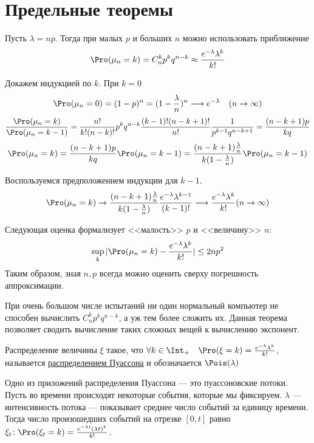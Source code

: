 \section{Предельные теоремы}

\begin{Th} [Пуассон]
Пусть $\lambda = np$. Тогда при малых $p$ и больших $n$ можно использовать приближение
$$\Pro(\mu_n = k) = C_n^kp^kq^{n-k} \approx \frac{e^{-\lambda}\lambda^k}{k!}$$
\end{Th}
\begin{Proof}
Докажем индукцией по $k$. При $k = 0$
$$\Pro(\mu_n = 0) = (1-p)^n = (1 - \frac{\lambda}{n})^n \longrightarrow e^{-\lambda} \quad (n \to \infty)$$
$$\frac{\Pro(\mu_n = k)}{\Pro(\mu_n = k-1)} = \frac{n!}{k!(n-k)!}p^kq^{n-k} \frac{(k-1)!(n-k+1)!}{n!} \frac{1}{p^{k-1}q^{n-k+1}} = \frac{(n-k+1)p}{kq}$$
$$\Pro(\mu_n = k) = \frac{(n-k+1)p}{kq}\Pro(\mu_n = k-1) = \frac{(n-k+1)\frac{\lambda}n}{k(1-\frac{\lambda}n)}\Pro(\mu_n = k-1)$$

Воспользуемся предположением индукции для $k-1$.
$$\Pro(\mu_n = k) \to \frac{(n-k+1)\frac{\lambda}n}{k(1-\frac{\lambda}n)} \frac{e^{-\lambda}\lambda^{k-1}}{(k-1)!} \longrightarrow \frac{e^{-\lambda}\lambda^{k}}{k!} (n \to \infty)$$
\end{Proof}

Следующая оценка формализует <<малость>> $p$ и <<величину>> $n$:
$$\sup\limits_k |\Pro(\mu_n = k) - \frac{e^{-\lambda}\lambda^k}{k!}| \le 2np^2$$
Таким образом, зная $n, p$ всегда можно оценить сверху погрешность аппроксимации.\\
\begin{Why}
При очень большом числе испытаний ни один нормальный компьютер не способен вычислить  $ C_n^kp^kq^{n-k}$, а уж тем более сложить их. Данная теорема позволяет сводить вычисление таких сложных вещей к вычислению экспонент.
\end{Why}

Распределение величины $\xi$ такое, что $\forall k \in \Int_+\quad  \Pro(\xi = k) =\frac{e^{-\lambda}\lambda^k}{k!}$, называется \underline{распределением Пуассона} 
и обозначается $\Pois(\lambda)$

Одно из приложений распределения Пуассона --- это пуассоновские потоки. Пусть во времени происходят некоторые события, которые мы фиксируем. $\lambda$ --- интенсивность потока --- показывает среднее число событий за единицу времени. Тогда число произошедших событий на отрезке $[0, t]$ равно $\xi_t\colon \Pro(\xi_t = k) = \frac{e^{-\lambda t}(\lambda t)^k}{k!}$.

